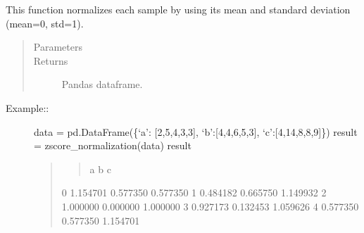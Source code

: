 \documentclass[letterpaper,10pt,english]{sphinxmanual}
\begin{document}
\begin{fulllineitems}
\label{\detokenize{_autosummary/analytics_core.analytics:analytics_core.analytics.analytics.zscore_normalization}}
This function normalizes each sample by using its mean and standard deviation (mean=0, std=1).
\begin{quote}\begin{description}
\item[{Parameters}] \leavevmode
{} \textendash{} 

\item[{Returns}] \leavevmode
Pandas dataframe.

\end{description}\end{quote}
\begin{description}
\item[{Example::}] \leavevmode
data = pd.DataFrame(\{‘a’: {[}2,5,4,3,3{]}, ‘b’:{[}4,4,6,5,3{]}, ‘c’:{[}4,14,8,8,9{]}\})
result = zscore\_normalization(data)
result
\begin{quote}
\begin{quote}

a         b         c
\end{quote}

0 \sphinxhyphen{}1.154701  0.577350  0.577350
1 \sphinxhyphen{}0.484182 \sphinxhyphen{}0.665750  1.149932
2 \sphinxhyphen{}1.000000  0.000000  1.000000
3 \sphinxhyphen{}0.927173 \sphinxhyphen{}0.132453  1.059626
4 \sphinxhyphen{}0.577350 \sphinxhyphen{}0.577350  1.154701
\end{quote}

\end{description}

\end{fulllineitems}

\end{document}
